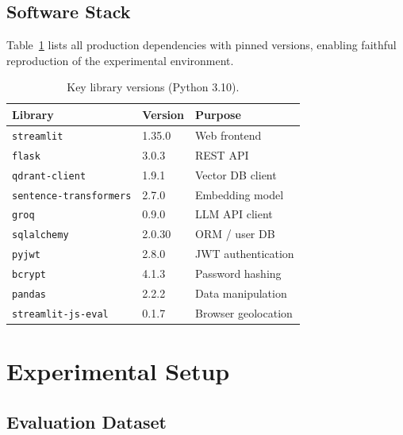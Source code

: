 \documentclass[10pt, twocolumn]{article}
\begin{document}
\subsection{Software Stack}
\label{sec:software}

Table~\ref{tab:libraries} lists all production dependencies with pinned
versions, enabling faithful reproduction of the experimental environment.

\begin{table}[H]
  \centering
  \caption{Key library versions (Python 3.10).}
  \label{tab:libraries}
  \begin{tabular}{@{}lll@{}}
    \toprule
    \textbf{Library}        & \textbf{Version} & \textbf{Purpose}         \\
    \midrule
    \texttt{streamlit}      & 1.35.0           & Web frontend             \\
    \texttt{flask}          & 3.0.3            & REST API                 \\
    \texttt{qdrant-client}  & 1.9.1            & Vector DB client         \\
    \texttt{sentence-transformers} & 2.7.0    & Embedding model          \\
    \texttt{groq}           & 0.9.0            & LLM API client           \\
    \texttt{sqlalchemy}     & 2.0.30           & ORM / user DB            \\
    \texttt{pyjwt}          & 2.8.0            & JWT authentication        \\
    \texttt{bcrypt}         & 4.1.3            & Password hashing         \\
    \texttt{pandas}         & 2.2.2            & Data manipulation        \\
    \texttt{streamlit-js-eval} & 0.1.7        & Browser geolocation      \\
    \bottomrule
  \end{tabular}
\end{table}

\section{Experimental Setup}
\label{sec:setup}

\subsection{Evaluation Dataset}
\end{document}
